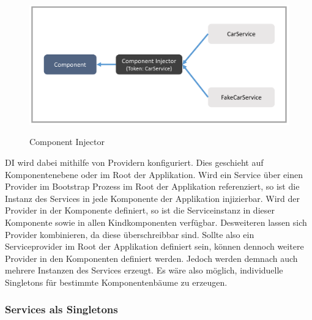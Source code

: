 \vspace{0.3cm}

\begin{figure}[ht]
 \centering
 \includegraphics[width=0.8\linewidth]{kapitel3/component-injector.png}
 \caption{Component Injector}\cite[343]{Angular2}
\end{figure}
\vspace{0.3cm}

\ac{DI} wird dabei mithilfe von Providern konfiguriert.
Dies geschieht auf Komponentenebene oder im Root der Applikation.
Wird ein Service über einen Provider im Bootstrap Prozess im Root der Applikation referenziert,
so ist die Instanz des Services in jede Komponente der Applikation injizierbar.
Wird der Provider in der Komponente definiert, so ist die Serviceinstanz in dieser Komponente sowie in
allen Kindkomponenten verfügbar. Desweiteren lassen sich Provider kombinieren, da diese überschreibbar sind.
Sollte also ein Serviceprovider im Root der Applikation definiert sein, können dennoch weitere Provider in den Komponenten definiert werden.
Jedoch werden demnach auch mehrere Instanzen des Services erzeugt.
Es wäre also möglich, individuelle Singletons für bestimmte Komponentenbäume zu erzeugen. \cite[286]{Angular2}

\vspace{0.2cm}

\vspace{0.2cm}

\vspace{0.2cm}

\vspace{0.2cm}


\subsubsection{Services als Singletons}
\label{Services-als-Singletons}

